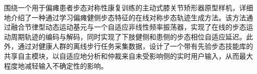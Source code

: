围绕一个用于偏瘫患者步态对称性康复训练的主动式膝关节矫形器原型样机，详细地介绍了一种通过学习偏瘫健侧步态特征的在线对称步态轨迹生成方法。该方法通过融合节律型动态运动基元与一个自适应非线性频率振荡器，实现了在线的步态运动周期轨迹的编码与解码，同时实现了下肢健侧和患侧的步态相位自适应延迟。此外，通过对健康人群的离线步行任务采集数据，设计了一个带有先验步态技能库的共享自主模块，以自适应地分析和仲裁来自未受影响侧的实时用户输入，从而最大程度地减轻输入不确定性的影响。